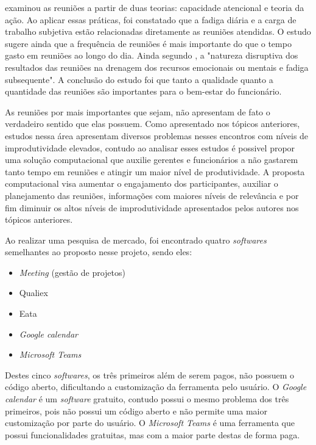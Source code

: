  examinou as reuniões a partir de duas teorias: capacidade atencional e teoria da ação. Ao aplicar essas práticas, foi constatado que a fadiga diária e a carga de trabalho subjetiva estão relacionadas diretamente as reuniões atendidas. O estudo sugere ainda que a frequência de reuniões é mais importante do que o tempo gasto em reuniões ao longo do dia. Ainda segundo , a "natureza disruptiva dos resultados das reuniões na drenagem dos recursos emocionais ou mentais e fadiga subsequente". A conclusão do estudo foi que tanto a qualidade quanto a quantidade das reuniões são importantes para o bem-estar do funcionário. 

As reuniões por mais importantes que sejam, não apresentam de fato o verdadeiro sentido que elas possuem. Como apresentado nos tópicos anteriores, estudos nessa área apresentam diversos problemas nesses encontros com níveis de improdutividade elevados, contudo ao analisar esses estudos é possivel propor uma solução computacional que auxilie gerentes e funcionários a não gastarem tanto tempo em reuniões e atingir um maior nível de produtividade. A proposta computacional visa aumentar o engajamento dos participantes, auxiliar o planejamento das reuniões, informações com maiores níveis de relevância e por fim diminuir os altos níveis de improdutividade apresentados pelos autores nos tópicos anteriores.

Ao realizar uma pesquisa de mercado, foi encontrado quatro \textit{softwares} semelhantes ao proposto nesse projeto, sendo eles: 

\begin{itemize}
    \item \textit{Meeting} (gestão de projetos)
    \item Qualiex
    \item Eata
    \item \textit{Google calendar}
    \item \textit{Microsoft Teams}
\end{itemize}

Destes cinco \textit{softwares}, os três primeiros além de serem pagos, não possuem o código aberto, dificultando a customização da ferramenta pelo usuário. O \textit{Google calendar} é um \textit{software} gratuito, contudo possui o mesmo problema dos três primeiros, pois não possui um código aberto e não permite uma maior customização por parte do usuário. O \textit{Microsoft Teams} é uma ferramenta que possui funcionalidades gratuitas, mas com a maior parte destas de forma paga.

